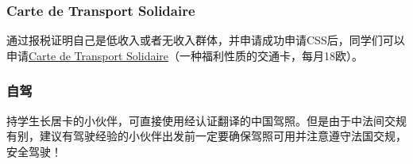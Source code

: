 \subsubsection{Carte de Transport Solidaire}
通过报税证明自己是低收入或者无收入群体，并申请成功申请CSS后，同学们可以申请\href{https://www.solidaritetransport.fr/}{Carte de Transport Solidaire}（一种福利性质的交通卡，每月18欧）。

\subsubsection{自驾}
持学⽣长居卡的⼩伙伴，可直接使用经认证翻译的中国驾照。但是由于中法间交规有别，建议有驾驶经验的⼩伙伴出发前⼀定要确保驾照可用并注意遵守法国交规，安全驾驶！
